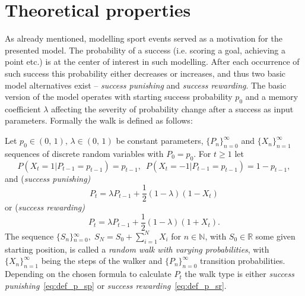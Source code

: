 \documentclass[runningheads]{CMSIM}
\begin{document}
    \section{Theoretical properties}\label{sec:theoretical-properties}

    As already mentioned, modelling sport events served as a motivation for the presented model.
    The probability of a success (i.e. scoring a goal, achieving
    a point etc.) is at the center of interest in such modelling.
    After each occurrence
    of such success this probability either decreases or increases, and
    thus two basic model alternatives exist -- \emph{success punishing} and \emph{success rewarding}.
    The basic version of the model operates
    with starting success probability $p_{0}$ and a memory coefficient
    $\lambda$ affecting the severity of probability change after a success
    as input parameters.
    Formally the walk is defined as follows:
    \begin{definition}
        \label{def:walk_definition}Let $\ensuremath{p_{0}\in(0,\,1),\,\lambda\in(0,\,1)}$
        be constant parameters, ${\{P_{n}\}}_{n=0}^{\infty}$ and ${\{X_{n}\}}_{n=1}^{\infty}$
        sequences of discrete random variables with $P_{0}=p_{0}$.
        For $t\ge1$ let
        \[
            P(X_{t}=1|P_{t-1}=p_{t-1})=p_{t-1},\,\,\,P(X_{t}=-1|P_{t-1}=p_{t-1})=1-p_{t-1},
        \]
        and (\emph{success punishing)}
        \begin{equation}
            P_{t}=\lambda P_{t-1}+\frac{1}{2}(1-\lambda)(1-X_{t})\label{eq:def_p_sp}
        \end{equation}
        or (\emph{success rewarding)
            \begin{equation}
                P_{t}=\lambda P_{t-1}+\frac{1}{2}(1-\lambda)(1+X_{t}).\label{eq:def_p_sr}
            \end{equation}
        }The sequence ${\{S_{n}\}}{}_{n=0}^{\infty},\;S_{N}=S_{0}+\sum_{i=1}^{N}X_{i}$
        for $n\in\mathbb{N}$, with $S_{0}\in\mathbb{R}$ some given starting
        position, is called a \emph{random walk with varying probabilities},
        with ${\{X_{n}\}}_{n=1}^{\infty}$ being the steps of the walker and
        ${\{P_{n}\}}_{n=0}^{\infty}$ transition probabilities.
        Depending
        on the chosen formula to calculate $P_{t}$ the walk type is either
        \emph{success punishing}~\eqref{eq:def_p_sp} or \emph{success rewarding}~\eqref{eq:def_p_sr}.
    \end{definition}
\end{document}

